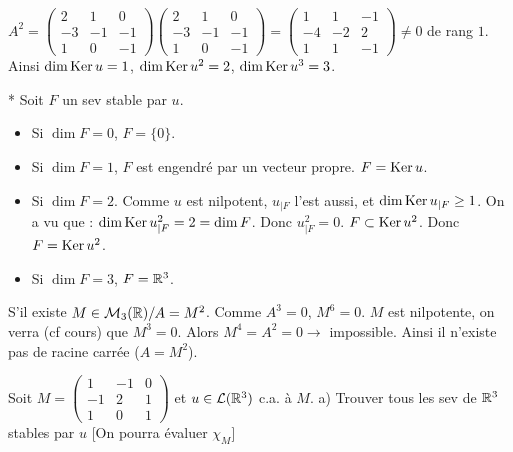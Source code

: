 \begin{solution}
$A^2 = \begin{pmatrix} 2 & 1 & 0 \\ -3 & -1 & -1 \\ 1 & 0 & -1 \end{pmatrix} \begin{pmatrix} 2 & 1 & 0 \\ -3 & -1 & -1 \\ 1 & 0 & -1 \end{pmatrix} = \begin{pmatrix} 1 & 1 & -1 \\ -4 & -2 & 2 \\ 1 & 1 & -1 \end{pmatrix} \neq 0$ de rang $1$.
Ainsi $\dim \operatorname{Ker} u = 1$, $\dim \operatorname{Ker} u^2 = 2$, $\dim \operatorname{Ker} u^3 = 3$.

* Soit $F$ un sev stable par $u$.
\begin{itemize}
  \item Si $\dim F = 0$, $F = \{0\}$.
  \item Si $\dim F = 1$, $F$ est engendré par un vecteur propre. $F = \operatorname{Ker} u$.
  \item Si $\dim F = 2$. Comme $u$ est nilpotent, $u_{|F}$ l'est aussi, et $\dim \operatorname{Ker} u_{|F} \geq 1$.
  On a vu que : $\dim \operatorname{Ker} u_{|F}^2 = 2 = \dim F$.
  Donc $u_{|F}^2 = 0$.
  $F \subset \operatorname{Ker} u^2$. Donc $F = \operatorname{Ker} u^2$.
  \item Si $\dim F = 3$, $F = \mathbb R^3$.
\end{itemize}

S'il existe $M \in \mathcal M_3(\mathbb R) / A = M^2$.
Comme $A^3 = 0$, $M^6 = 0$.
$M$ est nilpotente, on verra (cf cours) que $M^3 = 0$.
Alors $M^4 = A^2 = 0 \to$ impossible.
Ainsi il n'existe pas de racine carrée ($A = M^2$).
\end{solution}


\begin{statementbox}
Soit $M = \begin{pmatrix} 1 & -1 & 0 \\ -1 & 2 & 1 \\ 1 & 0 & 1 \end{pmatrix}$ et $u \in \mathcal L(\mathbb R^3)$ c.a. à $M$.
a) Trouver tous les sev de $\mathbb R^3$ stables par $u$ [On pourra évaluer $\chi_M$]
\end{statementbox}

